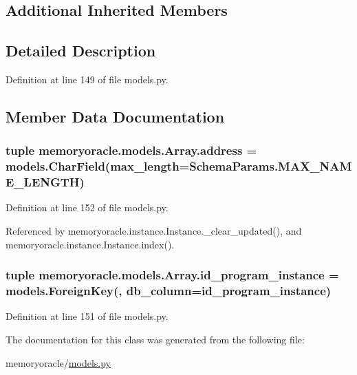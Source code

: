 \subsection*{Additional Inherited Members}


\subsection{Detailed Description}


Definition at line 149 of file models.\+py.



\subsection{Member Data Documentation}
\hypertarget{classmemoryoracle_1_1models_1_1Array_a15a3a1dd2f6586f9844fa4107f3c64c8}{}
\subsubsection[{address}]{\setlength{\rightskip}{0pt plus 5cm}tuple memoryoracle.\+models.\+Array.\+address = models.\+Char\+Field(max\+\_\+length={\bf Schema\+Params.\+M\+A\+X\+\_\+\+N\+A\+M\+E\+\_\+\+L\+E\+N\+G\+T\+H})\hspace{0.3cm}{\ttfamily [static]}}\label{classmemoryoracle_1_1models_1_1Array_a15a3a1dd2f6586f9844fa4107f3c64c8}


Definition at line 152 of file models.\+py.



Referenced by memoryoracle.\+instance.\+Instance.\+\_\+clear\+\_\+updated(), and memoryoracle.\+instance.\+Instance.\+index().

\hypertarget{classmemoryoracle_1_1models_1_1Array_a8ca5f4283ab3e46c1c925f366b34d866}{}
\subsubsection[{id\+\_\+program\+\_\+instance}]{\setlength{\rightskip}{0pt plus 5cm}tuple memoryoracle.\+models.\+Array.\+id\+\_\+program\+\_\+instance = models.\+Foreign\+Key(\textquotesingle{}, db\+\_\+column=\textquotesingle{}id\+\_\+program\+\_\+instance\textquotesingle{})\hspace{0.3cm}{\ttfamily [static]}}\label{classmemoryoracle_1_1models_1_1Array_a8ca5f4283ab3e46c1c925f366b34d866}


Definition at line 151 of file models.\+py.



The documentation for this class was generated from the following file\+:\begin{DoxyCompactItemize}
\item 
memoryoracle/\hyperlink{models_8py}{models.\+py}\end{DoxyCompactItemize}
